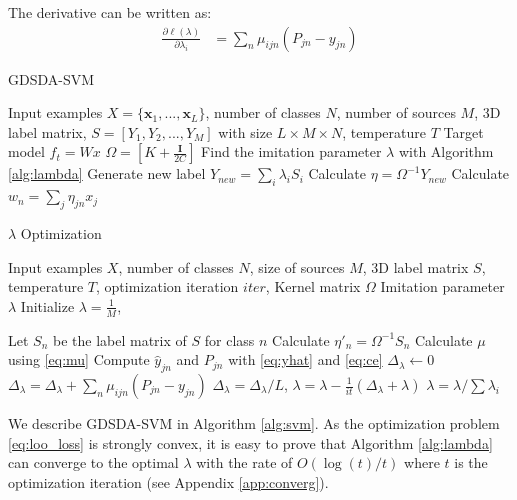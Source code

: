 The derivative can be written as:
\begin{equation}\label{eq:p}
\begin{aligned}
\frac{\partial \ell(\lambda)}{\partial \lambda_i}&=\sum_n\mu_{ijn}\left(P_{jn}-{y}_{jn}\right)
\end{aligned}
\end{equation}
\begin{algorithm}[t]
	\caption{GDSDA-SVM}\label{alg:svm}
	\begin{algorithmic}
		\REQUIRE Input examples $X=\{\textbf{x}_1,...,\textbf{x}_L\}$, number of classes $N$, number of sources $M$, 3D label matrix, $S=[Y_1,Y_2,...,Y_{M}]$ with size $L\times M \times N$, temperature $T$ %
		\ENSURE Target model $f_t = Wx$
		\STATE $\Omega=[K+\frac{\mathbf{I}}{2C}]$
		\STATE Find the imitation parameter $\lambda$ with Algorithm \ref{alg:lambda}
		\STATE Generate new label $Y_{new}=\sum_i\lambda_iS_i$
		\STATE Calculate $\eta = \Omega^{-1}Y_{new}$
		\STATE Calculate $w_n = \sum_j \eta_{jn}x_j$
	\end{algorithmic}    
\end{algorithm}
\begin{algorithm}[t]
	\caption{$\lambda$ Optimization}\label{alg:lambda}
	\begin{algorithmic}
		\REQUIRE Input examples $X$, number of classes $N$, size of sources $M$, 3D label matrix $S$, temperature $T$, optimization iteration $iter$, Kernel matrix $\Omega$
		\ENSURE Imitation parameter $\lambda$
		\STATE Initialize $\lambda = \frac{1}{M}$, 
		
		\STATE Let $S_n$ be the label matrix of $S$ for class $n$
		\STATE Calculate $\eta'_n=\Omega^{-1}S_n$ 
		\ENDFOR
		\STATE Calculate $\mu$ using \eqref{eq:mu}
		\STATE Compute $\hat{y}_{jn}$ and $P_{jn}$ with \eqref{eq:yhat}  and \eqref{eq:ce}
		\STATE $\Delta_{\lambda} \leftarrow 0$
		\STATE $\Delta_{\lambda} = \Delta_{\lambda}+\sum_n\mu_{ijn}\left(P_{jn}-{y}_{jn}\right)$
		\ENDFOR
		\STATE $\Delta_{\lambda} =\Delta_{\lambda}/L$, $\lambda = \lambda - \frac{1}{it}(\Delta_{\lambda}+\lambda)$
		\STATE $\lambda = \lambda / \sum\lambda_i$
		\ENDFOR
	\end{algorithmic}    
\end{algorithm}
We describe GDSDA-SVM in Algorithm \ref{alg:svm}. As the optimization problem \eqref{eq:loo_loss} is strongly convex, it is easy to prove that Algorithm \ref{alg:lambda} can converge to the optimal $\lambda$ with the rate of $O(\log(t)/t)$ where $t$ is the optimization iteration (see Appendix \ref{app:converg}).

